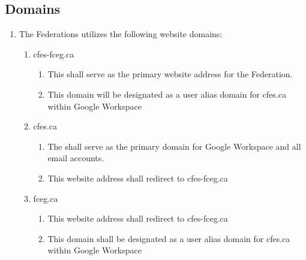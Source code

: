 \subsection{Domains}
\label{domains}

\begin{enumerate}
 \item
  The Federations utilizes the following website domains:

  \begin{enumerate}
   \item
    cfes-fceg.ca

    \begin{enumerate}
     \item
      This shall serve as the primary website address for the Federation.
     \item
      This domain will be designated as a user alias domain for cfes.ca within Google Workspace
    \end{enumerate}
   \item
    cfes.ca

    \begin{enumerate}
     \item
      The shall serve as the primary domain for Google Workspace and all email accounts.
     \item
      This website address shall redirect to cfes-fceg.ca
    \end{enumerate}
   \item
    fceg.ca

    \begin{enumerate}
     \item
      This website address shall redirect to cfes-fceg.ca
     \item
      This domain shall be designated as a user alias domain for cfes.ca within Google Workspace
    \end{enumerate}
  \end{enumerate}
\end{enumerate}

